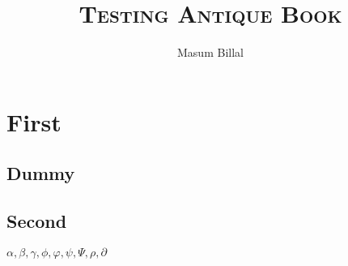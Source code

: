 \documentclass{antiquebook}
\author{Masum Billal}
\title{\scshape\textbf{Testing Antique Book}}
\begin{document}
	\frontmatter
	\maketitle
	\tableofcontents
	\mainmatter
	\chapter{First}
	\section{Dummy}
	\blindmathtrue
	\blindmathpaper
	\section{Second}
	\blindmathpaper
	$\alpha,\beta,\gamma,\phi,\varphi,\psi,\Psi,\rho,\partial$
\end{document}
